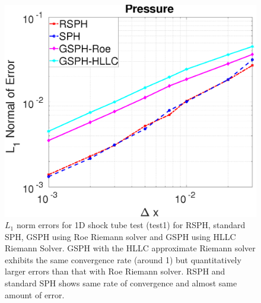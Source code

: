 \documentclass[review]{elsarticle}
\begin{document}
\begin{figure}[H]
\begin{minipage}{.332\textwidth}
        \centering
        \includegraphics[width=0.99 \textwidth]{./Figures/Accuracy-pre}
    \end{minipage}%
    \caption{ $L_1$ norm errors for 1D shock tube test (test1) for RSPH, standard SPH, GSPH using Roe Riemann solver and GSPH using HLLC Riemann Solver.  GSPH with the HLLC approximate Riemann solver exhibits the same convergence rate (around 1) but quantitatively larger errors than that with Roe Riemann solver. RSPH and standard SPH shows same rate of convergence and almost same amount of error.}
    \label{fig:Accuracy-test1}
\end{figure}
 
\end{document}
